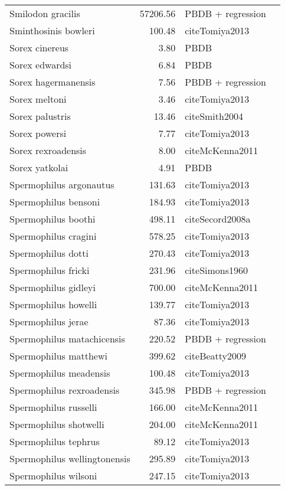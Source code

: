 \begin{table}[ht]
\begin{tabular}{lrll}
  Smilodon gracilis & 57206.56 & PBDB + regression &  \\ 
  Sminthosinis bowleri & 100.48 & cite{Tomiya2013} &  \\ 
  Sorex cinereus & 3.80 & PBDB &  \\ 
  Sorex edwardsi & 6.84 & PBDB &  \\ 
  Sorex hagermanensis & 7.56 & PBDB + regression &  \\ 
  Sorex meltoni & 3.46 & cite{Tomiya2013} &  \\ 
  Sorex palustris & 13.46 & cite{Smith2004} &  \\ 
  Sorex powersi & 7.77 & cite{Tomiya2013} &  \\ 
  Sorex rexroadensis & 8.00 & cite{McKenna2011} &  \\ 
  Sorex yatkolai & 4.91 & PBDB &  \\ 
  Spermophilus argonautus & 131.63 & cite{Tomiya2013} &  \\ 
  Spermophilus bensoni & 184.93 & cite{Tomiya2013} &  \\ 
  Spermophilus boothi & 498.11 & cite{Secord2008a} &  \\ 
  Spermophilus cragini & 578.25 & cite{Tomiya2013} &  \\ 
  Spermophilus dotti & 270.43 & cite{Tomiya2013} &  \\ 
  Spermophilus fricki & 231.96 & cite{Simons1960} &  \\ 
  Spermophilus gidleyi & 700.00 & cite{McKenna2011} &  \\ 
  Spermophilus howelli & 139.77 & cite{Tomiya2013} &  \\ 
  Spermophilus jerae & 87.36 & cite{Tomiya2013} &  \\ 
  Spermophilus matachicensis & 220.52 & PBDB + regression &  \\ 
  Spermophilus matthewi & 399.62 & cite{Beatty2009} &  \\ 
  Spermophilus meadensis & 100.48 & cite{Tomiya2013} &  \\ 
  Spermophilus rexroadensis & 345.98 & PBDB + regression &  \\ 
  Spermophilus russelli & 166.00 & cite{McKenna2011} &  \\ 
  Spermophilus shotwelli & 204.00 & cite{McKenna2011} &  \\ 
  Spermophilus tephrus & 89.12 & cite{Tomiya2013} &  \\ 
  Spermophilus wellingtonensis & 295.89 & cite{Tomiya2013} &  \\ 
  Spermophilus wilsoni & 247.15 & cite{Tomiya2013} &  \\ 

\end{tabular}
\end{table}
